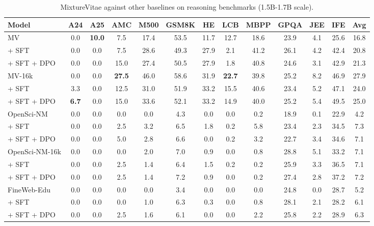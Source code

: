 \begin{table}[ht]
\centering
\caption{MixtureVitae against other baselines on reasoning benchmarks (1.5B-1.7B scale).}
\label{tab:evalchemy_table2}
\scriptsize
\begin{tabular}{lcccccccccccc}
\toprule
\textbf{Model} & \textbf{A24} & \textbf{A25} & \textbf{AMC} & \textbf{M500} & \textbf{GSM8K} & \textbf{HE} & \textbf{LCB} & \textbf{MBPP} & \textbf{GPQA} & \textbf{JEE} & \textbf{IFE} & \textbf{Avg} \\
\midrule
MV & 0.0 & \textbf{10.0} & 7.5 & 17.4 & 53.5 & 11.7 & 12.7 & 18.6 & 23.9 & 4.1 & 25.6 & 16.8 \\
\quad + SFT & 0.0 & 0.0 & 7.5 & 28.6 & 49.3 & 27.9 & 2.1 & 41.2 & 26.1 & 4.2 & 42.4 & 20.8 \\
\quad + SFT + DPO & 0.0 & 0.0 & 15.0 & 27.4 & 50.5 & 27.9 & 1.8 & 40.8 & 24.6 & 3.1 & 42.9 & 21.3 \\
\midrule
\addlinespace[0.3em]
MV-16k & 0.0 & 0.0 & \textbf{27.5} & 46.0 & 58.6 & 31.9 & \textbf{22.7} & 39.8 & 25.2 & 8.2 & 46.9 & 27.9 \\
\quad + SFT & 3.3 & 0.0 & 12.5 & 31.0 & 51.9 & 33.2 & 15.5 & 40.6 & 23.4 & 5.2 & 47.1 & 24.0 \\
\quad + SFT + DPO & \textbf{6.7} & 0.0 & 15.0 & 33.6 & 52.1 & 33.2 & 14.9 & 40.0 & 25.2 & 5.4 & 49.5 & 25.0 \\
\midrule
\addlinespace[0.3em]
OpenSci-NM & 0.0 & 0.0 & 0.0 & 0.0 & 4.3 & 0.0 & 0.0 & 0.2 & 18.9 & 0.1 & 22.9 & 4.2 \\
\quad + SFT & 0.0 & 0.0 & 2.5 & 3.2 & 6.5 & 1.8 & 0.2 & 5.8 & 23.4 & 2.3 & 34.5 & 7.3 \\
\quad + SFT + DPO & 0.0 & 0.0 & 5.0 & 2.8 & 6.6 & 0.0 & 0.2 & 3.2 & 22.7 & 3.4 & 34.6 & 7.1 \\
\midrule
\addlinespace[0.3em]
OpenSci-NM-16k & 0.0 & 0.0 & 0.0 & 2.0 & 7.0 & 0.9 & 0.0 & 0.8 & 28.8 & 5.1 & 33.2 & 7.1 \\
\quad + SFT & 0.0 & 0.0 & 2.5 & 1.4 & 6.4 & 1.5 & 0.2 & 0.2 & 25.9 & 3.3 & 36.5 & 7.1 \\
\quad + SFT + DPO & 0.0 & 0.0 & 2.5 & 1.4 & 7.2 & 0.9 & 0.0 & 0.2 & 27.4 & 2.8 & 37.2 & 7.2 \\
\midrule
\addlinespace[0.3em]
FineWeb-Edu & 0.0 & 0.0 & 0.0 & 0.0 & 3.4 & 0.0 & 0.0 & 0.0 & 24.8 & 0.0 & 28.7 & 5.2 \\
\quad + SFT & 0.0 & 0.0 & 0.0 & 1.0 & 6.3 & 0.3 & 0.0 & 0.8 & 28.1 & 2.1 & 28.2 & 6.1 \\
\quad + SFT + DPO & 0.0 & 0.0 & 2.5 & 1.6 & 6.1 & 0.0 & 0.0 & 2.2 & 25.8 & 2.2 & 28.9 & 6.3 \\

\end{tabular}
\end{table}
